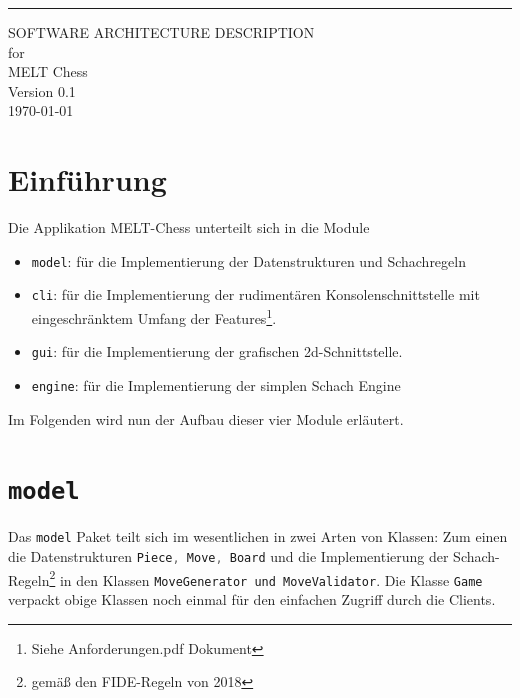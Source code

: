 \documentclass{scrreprt}
\date{}
\def\myversion{0.1 }
\newcommand{\lstinlinejava}[1]{\lstinline[language=java]{#1}}
\newcommand{\lstj}[1]{\lstinlinejava{#1}}
\begin{document}
\begin{flushright}
    \rule{16cm}{5pt}\vskip1cm
    \begin{bfseries}
        \Huge{SOFTWARE ARCHITECTURE DESCRIPTION}\\
        \vspace{1.5cm}
        for\\
        \vspace{1.5cm}
        MELT Chess\\
        \vspace{1.5cm}
        \LARGE{Version \myversion}\\
        \vspace{1.5cm}
        \vspace{1.5cm}
        \today\\
    \end{bfseries}
\end{flushright}

\tableofcontents

\chapter{Einführung}

Die Applikation MELT-Chess unterteilt sich in die Module
\begin{itemize}
\item
  \lstinlinejava{model}: für die Implementierung der Datenstrukturen und Schachregeln
\item
  \lstinlinejava{cli}: für die Implementierung der rudimentären Konsolenschnittstelle mit eingeschränktem Umfang der Features\footnote{Siehe Anforderungen.pdf Dokument}.
\item
  \lstinlinejava{gui}: für die Implementierung der grafischen 2d-Schnittstelle.
\item
  \lstinlinejava{engine}: für die Implementierung der simplen Schach Engine
\end{itemize}

Im Folgenden wird nun der Aufbau dieser vier Module erläutert.

\chapter{\lstj{model}}

Das \lstj{model} Paket teilt sich im wesentlichen in zwei Arten von Klassen: Zum einen die Datenstrukturen \lstj{Piece, Move, Board} und die Implementierung der Schach-Regeln\footnote{gemäß den FIDE-Regeln von 2018} in den Klassen \lstj{MoveGenerator und MoveValidator}. Die Klasse \lstj{Game} verpackt obige Klassen noch einmal für den einfachen Zugriff durch die Clients.
\end{document}
